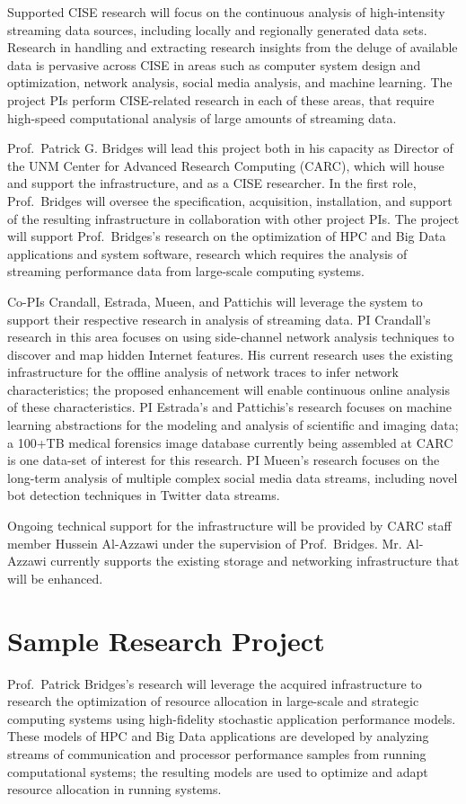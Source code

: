 \documentclass[11pt]{article}
\begin{document}
Supported CISE research will focus on the continuous analysis of high-intensity 
streaming data sources, including locally and regionally generated data sets. 
Research in handling and extracting research insights from the deluge of available data
is pervasive across CISE in areas such as computer system 
design and optimization, network analysis, social media analysis, and 
machine learning. The project PIs perform CISE-related research in each of these areas,
that require high-speed computational analysis of large amounts of streaming data.

Prof.~Patrick G. Bridges will lead this project both in his capacity as Director of the
UNM Center for Advanced Research Computing (CARC), which will house and support the
infrastructure, and as a CISE researcher. In the first role, Prof.~Bridges will 
oversee the specification, acquisition, installation, and support of the resulting 
infrastructure in collaboration with other project PIs. The project will support Prof.~Bridges's 
research on the optimization of HPC and Big Data applications and system software,
research which requires the analysis of streaming performance data from 
large-scale computing systems.

Co-PIs Crandall, Estrada, Mueen, and Pattichis will leverage the system to support their 
respective research in analysis of streaming data. PI Crandall's research in this area
focuses on using side-channel network analysis techniques to discover and map hidden
Internet features. His current research uses the existing infrastructure for the offline analysis
of network traces to infer network characteristics; the proposed enhancement will enable
continuous online analysis of these characteristics. PI Estrada's and Pattichis's research 
focuses on machine learning abstractions for the modeling and analysis of scientific and 
imaging data; a 100+TB medical forensics image database currently being assembled at CARC 
is one data-set of interest for this research. PI Mueen's research focuses on the long-term 
analysis of multiple complex social media data streams, including novel bot detection 
techniques in Twitter data streams.

Ongoing technical support for the infrastructure will be provided by CARC staff 
member Hussein Al-Azzawi under the supervision of Prof.~Bridges. Mr. Al-Azzawi 
currently supports the existing storage and networking infrastructure that will
be enhanced.

\section{Sample Research Project}
Prof.~Patrick Bridges's research will leverage the acquired infrastructure to 
research the optimization of resource allocation in large-scale and strategic computing systems 
using high-fidelity stochastic application performance models. These models of HPC and 
Big Data applications are developed by analyzing streams of communication and processor 
performance samples from running computational systems; the resulting models are used 
to optimize and adapt resource allocation in running systems.
\end{document}
